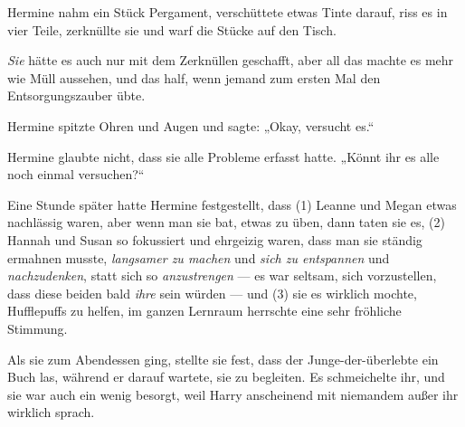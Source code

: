 Hermine nahm ein Stück Pergament, verschüttete etwas Tinte darauf, riss es in vier Teile, zerknüllte sie und warf die Stücke auf den Tisch.

\emph{Sie} hätte es auch nur mit dem Zerknüllen geschafft, aber all das machte es mehr wie Müll aussehen, und das half, wenn jemand zum ersten Mal den Entsorgungszauber übte.

Hermine spitzte Ohren und Augen und sagte:
„Okay, versucht es.“





Hermine glaubte nicht, dass sie alle Probleme erfasst hatte.
„Könnt ihr es alle noch einmal versuchen?“

Eine Stunde später hatte Hermine festgestellt, dass (1) Leanne und Megan etwas nachlässig waren, aber wenn man sie bat, etwas zu üben, dann taten sie es, (2) Hannah und Susan so fokussiert und ehrgeizig waren, dass man sie ständig ermahnen musste, \emph{langsamer zu machen} und \emph{sich zu entspannen} und \emph{nachzudenken}, statt sich so \emph{anzustrengen} — es war seltsam, sich vorzustellen, dass diese beiden bald \emph{ihre} sein würden — und (3) sie es wirklich mochte, Hufflepuffs zu helfen, im ganzen Lernraum herrschte eine sehr fröhliche Stimmung.

Als sie zum Abendessen ging, stellte sie fest, dass der Junge-der-überlebte ein Buch las, während er darauf wartete, sie zu begleiten. Es schmeichelte ihr, und sie war auch ein wenig besorgt, weil Harry anscheinend mit niemandem außer ihr wirklich sprach.

